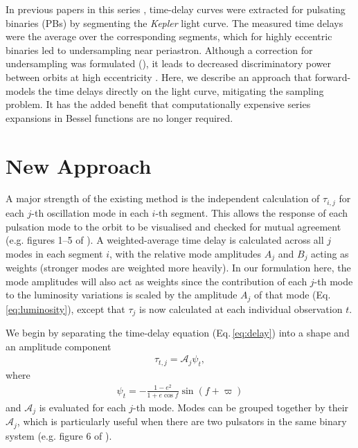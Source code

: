 \documentclass[a4paper,fleqn,usenatbib]{mnras}
\begin{document}
In previous papers in this series \citep{murphyetal2014, murphy&shibahashi2015, murphyetal2016b}, time-delay curves were extracted for pulsating binaries (PBs) by segmenting the \textit{Kepler} light curve. The measured time delays were the average over the corresponding segments, which for highly eccentric binaries led to undersampling near periastron. Although a correction for undersampling was formulated (\citealt{murphyetal2016b}), it leads to decreased discriminatory power between orbits at high eccentricity \citep{murphyetal2018}. Here, we describe an approach that forward-models the time delays directly on the light curve, mitigating the sampling problem. It has the added benefit that computationally expensive series expansions in Bessel functions are no longer required.

\section{New Approach}

A major strength of the existing method is the independent calculation of $\tau_{i,j}$ for each $j$-th oscillation mode in each $i$-th segment. This allows the response of each pulsation mode to the orbit to be visualised and checked for mutual agreement (e.g. figures 1--5 of \citealt{murphyetal2014}). A weighted-average time delay is calculated across all $j$ modes in each segment $i$, with the relative mode amplitudes $A_j$ and $B_j$ acting as weights (stronger modes are weighted more heavily). In our formulation here, the mode amplitudes will also act as weights since the contribution of each $j$-th mode to the luminosity variations is scaled by the amplitude $A_j$ of that mode (Eq.\,\ref{eq:luminosity}), except that $\tau_j$ is now calculated at each individual observation $t$.

We begin by separating the time-delay equation (Eq.\,\ref{eq:delay}) into a shape and an amplitude component
\begin{eqnarray}
\tau_{t, j} = \mathcal{A}_j \psi_t,
\label{eq:shape}
\end{eqnarray}
where
\begin{eqnarray}
\psi_t = -\frac{1-e^2}{1+e \cos f} \sin(f+\varpi)
\label{eq:psi}
\end{eqnarray}
and $\mathcal{A}_j$ is evaluated for each $j$-th mode. Modes can be grouped together by their $\mathcal{A}_j$, which is particularly useful when there are two pulsators in the same binary system (e.g. figure 6 of \citealt{murphyetal2014}).
\end{document}
